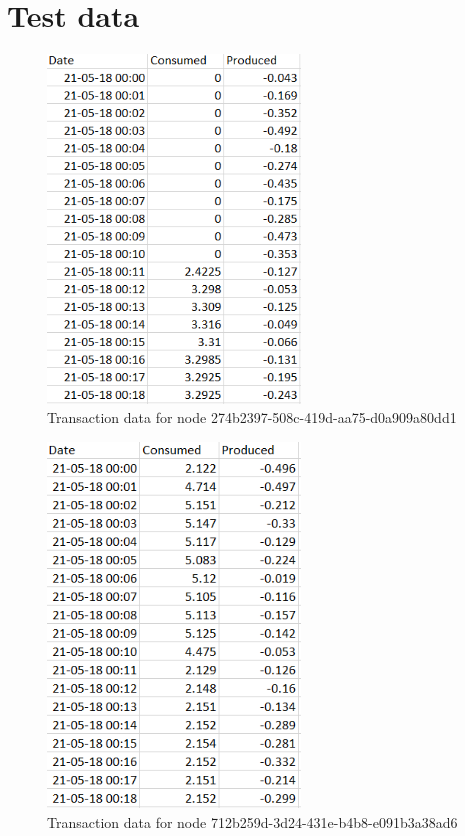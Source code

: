\chapter{Test data}\label{data}

\begin{figure}[htb]
\centering
	\includegraphics[width=0.6\textwidth]{Images/test_data1}
	\caption{Transaction data for node 274b2397-508c-419d-aa75-d0a909a80dd1}
	\label{fig:data1}
\end{figure}

\begin{figure}[htb]
\centering
	\includegraphics[width=0.6\textwidth]{Images/test_data2}
	\caption{Transaction data for node 712b259d-3d24-431e-b4b8-e091b3a38ad6}
	\label{fig:data2}
\end{figure}